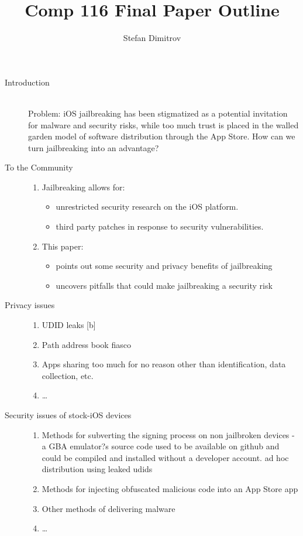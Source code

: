 \documentclass[12pt]{article}
\title{Comp 116 Final Paper Outline}
\author{Stefan Dimitrov}
\begin{document}
\maketitle

\begin{description}
  \item[Introduction] \hfill \\ Problem: iOS jailbreaking has been stigmatized as a potential invitation for malware and security risks, while too much trust is placed in the walled garden model of software distribution through the App Store. How can we turn jailbreaking into an advantage?

  \item[To the Community] \hfill 
  \begin{enumerate}
 \item  Jailbreaking allows for:
  		\begin{itemize}
		\item unrestricted security research on the iOS platform.
		\item third party patches in response to security vulnerabilities.
		\end{itemize}
 	 \item 	This paper:
		 \begin{itemize}
		\item points out some security and privacy benefits of jailbreaking
		\item uncovers pitfalls that could make jailbreaking a security risk
		\end{itemize}
	\end{enumerate}
	
 \item[Privacy issues] \hfill 
   	\begin{enumerate}
	\item UDID leaks [b]
	\item Path address book fiasco
	\item Apps sharing too much for no reason other than identification, data collection, etc.
	\item \ldots
	\end{enumerate}
 \item[Security issues of stock-iOS devices] \hfill 
    	\begin{enumerate}
	\item Methods for subverting the signing process on non jailbroken devices -  a GBA emulator?s source code used to be available on github and could be compiled and installed without a developer account. ad hoc distribution using leaked udids
	\item Methods for injecting obfuscated malicious code into an App Store app
	\item Other methods of delivering malware
	\item \ldots
	\end{enumerate}


\end{description}
\end{document}
